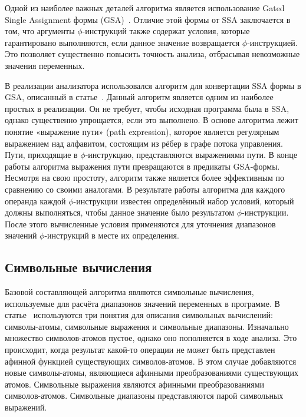 Одной из наиболее важных деталей алгоритма является использование
Gated Single Assignment формы
(GSA)~\cite{ottenstein1990program}. Отличие этой формы от SSA
заключается в том, что аргументы $\phi$-инструкций также содержат
условия, которые гарантировано выполняются, если данное значение
возвращается $\phi$-инструкцией. Это позволяет существенно повысить
точность анализа, отбрасывая невозможные значения переменных.

В реализации анализатора использовался алгоритм для конвертации SSA
формы в GSA, описанный в статье~\cite{tu1995efficient}. Данный
алгоритм является одним из наиболее простых в реализации. Он не
требует, чтобы исходная программа была в SSA, однако существенно
упрощается, если это выполнено. В основе алгоритма лежит понятие
«выражение пути» (path expression), которое является регулярным
выражением над алфавитом, состоящим из рёбер в графе потока
управления. Пути, приходящие в $\phi$-инструкцию, представляются
выражениями пути. В конце работы алгоритма выражения пути превращаются
в предикаты GSA-формы. Несмотря на свою простоту, алгоритм также
является более эффективным по сравнению со своими аналогами. В
результате работы алгоритма для каждого операнда каждой
$\phi$-инструкции известен определённый набор условий, который должны
выполняться, чтобы данное значение было результатом
$\phi$-инструкции. После этого вычисленные условия применяются для
уточнения диапазонов значений $\phi$-инструкций в месте их определения.

\subsection{Символьные вычисления}

Базовой составляющей алгоритма являются символьные вычисления,
используемые для расчёта диапазонов значений переменных в программе. В
статье~\cite{li2010practical} используются три понятия для описания
символьных вычислений: символы-атомы, символьные выражения и
символьные диапазоны. Изначально множество символов-атомов пустое,
однако оно пополняется в ходе анализа. Это происходит, когда результат
какой-то операции не может быть представлен афинной функцией
существующих символов-атомов. В этом случае добавляются новые
символы-атомы, являющиеся афинными преобразованиями существующих
атомов. Символьные выражения являются афинными преобразованиями
символов-атомов. Символьные диапазоны представляются парой символьных
выражений.

